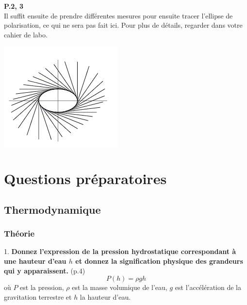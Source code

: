 \documentclass	[11pt, a4paper, openany]{book}
\begin{document}
\textbf{P.2, 3}\\
Il suffit ensuite de prendre différentes mesures pour ensuite tracer l'ellipse de polarisation, ce qui ne sera pas fait ici. Pour plus de détails, regarder dans votre cahier de labo.
\begin{center}
\includegraphics[scale=0.8]{labo/image7.png}
\end{center}















































\chapter{Questions préparatoires}
\section{Thermodynamique}
\newcommand{\quest}[3]{#1. \textbf{#3} (p.#2)}
	\subsection{Théorie}
	\quest{1}{4}{Donnez l'expression de la pression hydrostatique correspondant à une hauteur d'eau $h$ et donnez la signification physique des grandeurs qui y apparaissent.}
	$$P(h) = \rho g h$$ où $P$ est la pression, $\rho$ est la masse volumique de l’eau, $g$ est l’accélération de la gravitation terrestre et $h$ la hauteur d’eau.
	
\end{document}
